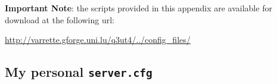 %
% 
%
%
%
%

\textbf{Important Note}: the scripts provided in this appendix are available for
download at the following url: 
\begin{center}
  \url{http://varrette.gforge.uni.lu/q3ut4/../config_files/}
\end{center}

\subsection{My personal \texttt{server.cfg}}
\label{anx:server.cfg}

